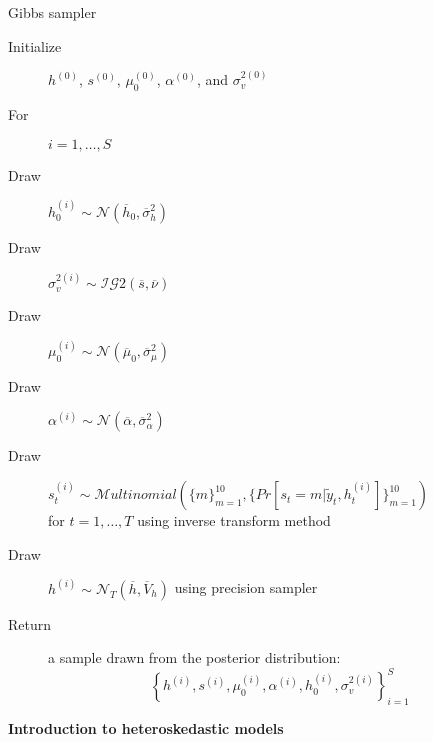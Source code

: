 \documentclass[notes,blackandwhite,mathsans,usenames,dvipsnames]{beamer}
\begin{document}
\begin{frame}{Gibbs sampler}

\bigskip\begin{description}
\item[Initialize] $h^{(0)}$, $s^{(0)}$, $\mu_0^{(0)}$, $\alpha^{(0)}$, and $\sigma_v^{2(0)}$

\bigskip\item[For] $i=1,\dots,S$

\bigskip\smallskip\item[Draw] $h_0^{(i)}\sim\mathcal{N}\left(\overline{h}_0,\overline{\sigma}_h^2  \right)$

\smallskip\item[Draw] $\sigma_v^{2(i)}\sim\mathcal{IG}2\left(\overline{s},\overline{\nu}  \right)$


\smallskip\smallskip\item[Draw] $\mu_0^{(i)}\sim\mathcal{N}\left(\overline{\mu}_0,\overline{\sigma}_\mu^2  \right)$

\smallskip\item[Draw] $\alpha^{(i)}\sim\mathcal{N}\left(\overline{\alpha},\overline{\sigma}_\alpha^2  \right)$


\smallskip\item[Draw] $s_t^{(i)}\sim\mathcal{M}ultinomial\left(\{m\}_{m=1}^{10}, \{Pr[s_t=m|\tilde{y}_t, h_t^{(i)}]\}_{m=1}^{10} \right)$\\ for $t=1,\dots,T$ {\color{mcxs2}using inverse transform method}

\smallskip\item[Draw] $h^{(i)}\sim\mathcal{N}_T\left(\overline{h},\overline{V}_h  \right)$ {\color{mcxs2}using precision sampler}

\bigskip\item[Return] {\color{mcxs2}a sample drawn from the posterior distribution:} $$\left\{ h^{(i)}, s^{(i)}, \mu_0^{(i)}, \alpha^{(i)}, h_0^{(i)}, \sigma_v^{2(i)} \right\}_{i=1}^{S}$$
\end{description}

\end{frame}










{
\begin{frame}

\begin{adjustwidth}{-0.5cm}{0cm}
\FlushLeft
\vspace{8.3cm}\Large
\textbf{{\color{mcxs2}Introduction to} {\color{mcxs5}heteroskedastic models}}
\end{adjustwidth}

\end{frame}
}
\end{document}
